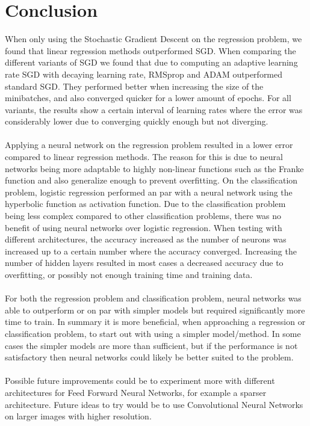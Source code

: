 \documentclass[a4paper,twocolumn]{article}
\begin{document}
\section{Conclusion}
When only using the Stochastic Gradient Descent on the regression problem, we found that linear regression methods outperformed SGD. When comparing the different variants of SGD we found that due to computing an adaptive learning rate SGD with decaying learning rate, RMSprop and ADAM outperformed standard SGD. They performed better when increasing the size of the minibatches, and also converged quicker for a lower amount of epochs. For all variants, the results show a certain interval of learning rates where the error was considerably lower due to converging quickly enough but not diverging.\\
\\
Applying a neural network on the regression problem resulted in a lower error compared to linear regression methods. The reason for this is due to neural networks being more adaptable to highly non-linear functions such as the Franke function and also generalize enough to prevent overfitting. On the classification problem, logistic regression performed an par with a neural network using the hyperbolic function as activation function. Due to the classification problem being less complex compared to other classification problems, there was no benefit of using neural networks over logistic regression. When testing with different architectures, the accuracy increased as the number of neurons was increased up to a certain number where the accuracy converged. Increasing the number of hidden layers resulted in most cases a decreased accuracy due to overfitting, or possibly not enough training time and training data. \\
\\
For both the regression problem and classification problem, neural networks was able to outperform or on par with simpler models but required significantly more time to train. In summary it is more beneficial, when approaching a regression or classification problem, to start out with using a simpler model/method. In some cases the simpler models are more than sufficient, but if the performance is not satisfactory then neural networks could likely be better suited to the problem.\\
\\
Possible future improvements could be to experiment more with different architectures for Feed Forward Neural Networks, for example a sparser architecture. Future ideas to try would be to use Convolutional Neural Networks on larger images with higher resolution.
\end{document}
